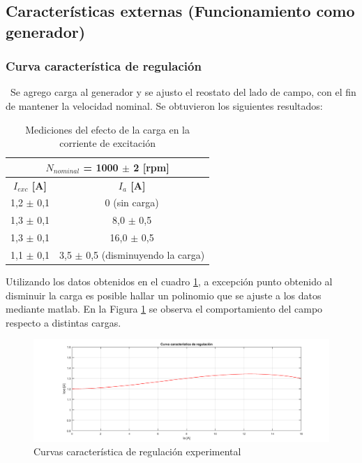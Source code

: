 \documentclass[11pt,letterpaper]{article}     %
\begin{document}
\subsection{Características externas (Funcionamiento como generador)}
\subsubsection{Curva característica de regulación}
\
Se agrego carga al generador y se ajusto el reostato del lado de campo, con el fin de mantener la velocidad nominal. Se obtuvieron los siguientes resultados:
\begin{table}[H]
	\centering
	\caption{Mediciones del efecto de la carga en la corriente de excitación}
	\label{MedCurvaCaractReg}
	\begin{tabular}{|c|c|}
		\hline
		\multicolumn{2}{|c|}{\textbf{$N_{nominal}$ = 1000 $\pm$ 2 {[}rpm{]}}} \\ \hline
		\textbf{$I_{exc}$ {[}A{]}}   & \textbf{$I_{a}$ {[}A{]}}               \\ \hline
		1,2 $\pm$ 0,1                & 0 (sin carga)                          \\ \hline
		1,3 $\pm$ 0,1                & 8,0 $\pm$ 0,5                          \\ \hline
		1,3 $\pm$ 0,1                & 16,0 $\pm$ 0,5                         \\ \hline
		1,1 $\pm$ 0,1                & 3,5 $\pm$ 0,5 (disminuyendo la carga)  \\ \hline
	\end{tabular}
\end{table}
Utilizando los datos obtenidos en el cuadro \ref{MedCurvaCaractReg}, a excepción punto obtenido al disminuir la carga es posible hallar un polinomio que se ajuste a los datos mediante matlab. En la Figura \ref{fig:curvaCaractReg} se observa el comportamiento del campo respecto a distintas cargas.
\begin{figure}[H]
	\centering
	\includegraphics[scale=0.5]{./recursos-Lab6/curvaCaractRegulacion.png}
	\caption{Curvas característica de regulación experimental}
	\label{fig:curvaCaractReg}
\end{figure}
\end{document}
